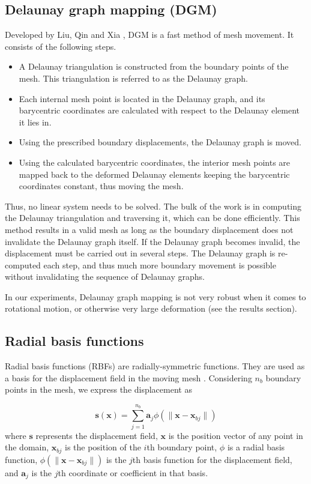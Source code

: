 \subsection{Delaunay graph mapping (DGM)}
 Developed by Liu, Qin and Xia \cite{mm:dgm}, DGM is a fast method of mesh movement. It consists of the following steps.
 \begin{itemize}
 	\item A Delaunay triangulation is constructed from the boundary points of the mesh. This triangulation is referred to as the Delaunay graph.
 	\item Each internal mesh point is located in the Delaunay graph, and its barycentric coordinates are calculated with respect to the Delaunay element it lies in.
 	\item Using the prescribed boundary displacements, the Delaunay graph is moved.
 	\item Using the calculated barycentric coordinates, the interior mesh points are mapped back to the deformed Delaunay elements keeping the barycentric coordinates constant, thus moving the mesh.
 \end{itemize}
 Thus, no linear system needs to be solved. The bulk of the work is in computing the Delaunay triangulation and traversing it, which can be done efficiently. This method results in a valid mesh as long as the boundary displacement does not invalidate the Delaunay graph itself. If the Delaunay graph becomes invalid, the displacement must be carried out in several steps. The Delaunay graph is re-computed each step, and thus much more boundary movement is possible without invalidating the sequence of Delaunay graphs.
 
 In our experiments, Delaunay graph mapping is not very robust when it comes to rotational motion, or otherwise very large deformation (see the results section).
 
 \subsection{Radial basis functions}
 
 Radial basis functions (RBFs) are radially-symmetric functions. They are used as a basis for the displacement field in the moving mesh \cite{mm:rbf}. Considering $n_b$ boundary points in the mesh, we express the displacement as
 
 \begin{equation}
 \mathbf{s}(\mathbf{x}) = \sum_{j=1}^{n_b} \mathbf{a}_j \phi(\lVert\mathbf{x} - \mathbf{x}_{bj}\rVert)
 \label{eqn:rbf}
 \end{equation}
 where $\mathbf{s}$ represents the displacement field, $\mathbf{x}$ is the position vector of any point in the domain, $\mathbf{x}_{bj}$ is the position of the $i$th boundary point, $\phi$ is a radial basis function, $\phi(\lVert\mathbf{x} - \mathbf{x}_{bj}\rVert)$ is the $j$th basis function for the displacement field, and $\mathbf{a}_j$ is the $j$th coordinate or coefficient in that basis.
 

